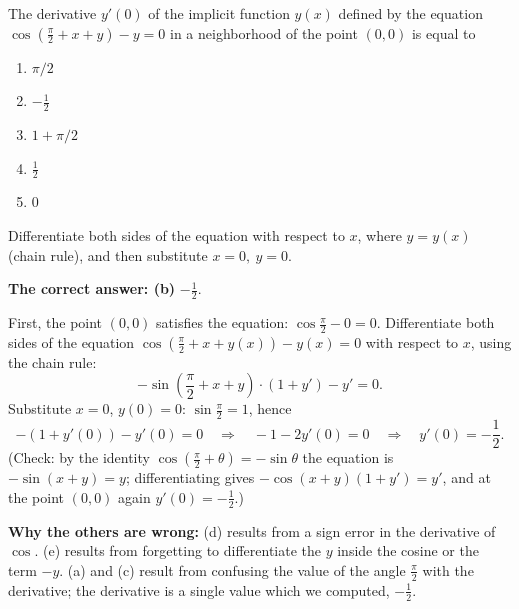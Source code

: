 
\begin{question}
The derivative $y'(0)$ of the implicit function $y(x)$ defined by the equation
$\cos\left(\frac{\pi}{2}+x+y\right)-y=0$ in a neighborhood of the point $(0,0)$ is equal to
\begin{enumerate}
  \item $\pi/2$
  \item $-\frac12$
  \item $1+\pi/2$
  \item $\frac12$
  \item $0$
\end{enumerate}
\end{question}

\begin{hint}
Differentiate both sides of the equation with respect to $x$, where $y=y(x)$ (chain rule), and then substitute $x=0,\ y=0$.
\end{hint}

\begin{solution}
\textbf{The correct answer: (b)} $-\frac12$.

First, the point $(0,0)$ satisfies the equation: $\cos\frac{\pi}{2}-0=0$.
Differentiate both sides of the equation $\cos\left(\frac{\pi}{2}+x+y(x)\right)-y(x)=0$ with respect to $x$, using the chain rule:
\[
-\sin\left(\frac{\pi}{2}+x+y\right)\cdot\left(1+y'\right)-y'=0 .
\]
Substitute $x=0$, $y(0)=0$: $\sin\frac{\pi}{2}=1$, hence
\[
-(1+y'(0))-y'(0)=0\quad\Longrightarrow\quad -1-2y'(0)=0\quad\Longrightarrow\quad y'(0)=\boxed{-\frac12}.
\]
(Check: by the identity $\cos(\frac{\pi}{2}+\theta)=-\sin\theta$ the equation is $-\sin(x+y)=y$; differentiating gives $-\cos(x+y)(1+y')=y'$, and at the point $(0,0)$ again $y'(0)=-\frac12$.)

\textbf{Why the others are wrong:} (d) results from a sign error in the derivative of $\cos$. (e) results from forgetting to differentiate the $y$ inside the cosine or the term $-y$. (a) and (c) result from confusing the value of the angle $\frac{\pi}{2}$ with the derivative; the derivative is a single value which we computed, $-\frac12$.
\end{solution}
